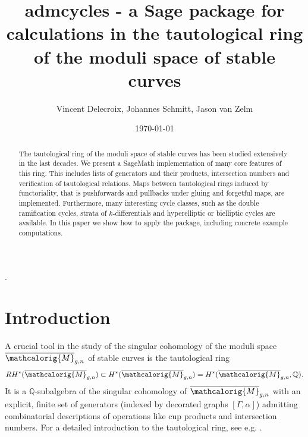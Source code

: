 \documentclass[11pt]{article}
\title{admcycles - a {S}age package for calculations in the tautological ring of the moduli space of stable curves}
\author{Vincent Delecroix, Johannes Schmitt, Jason van Zelm}
\date{\today}
\newcommand{\M}{\ensuremath{\overline{\mathcalorig{M}}}}
\newcommand{\Sage}{SageMath}
\begin{document}

\maketitle



  {}%
  {}%
  {\it}%
  {}%
  {\bfseries}%
  {.}%
  { }%
  {}%

 \theoremstyle{test}
\newtheorem{Def}{Definition}[section]
\newtheorem{Exa}[Def]{Example}
\newtheorem{Rmk}[Def]{Remark}
\newtheorem{Exe}[Def]{Exercise}
\newtheorem{Theo}[Def]{Theorem}
\newtheorem{Lem}[Def]{Lemma}
\newtheorem{Cor}[Def]{Corollary}
\newtheorem{Pro}[Def]{Proposition}
\newtheorem*{Rmk*}{Remark}   %
\newtheorem*{Exa*}{Example}   %
\newtheorem*{Pro*}{Proposition} %
\newtheorem*{Def*}{Definition}
\newtheorem*{Cor*}{Corollary}
\newtheorem*{Lem*}{Lemma}
\newtheorem*{Theo*}{Theorem}

\begin{abstract}
 The tautological ring of the moduli space of stable curves has been studied extensively in the last decades. We present a \Sage{} implementation of many core features of this ring. This includes lists of generators and their products, intersection numbers and verification of tautological relations. Maps between tautological rings induced by functoriality, that is pushforwards and pullbacks under gluing and forgetful maps, are implemented. Furthermore, many interesting cycle classes, such as the double ramification cycles, strata of $k$-differentials and hyperelliptic or bielliptic cycles are available. In this paper we show how to apply the package, including concrete example computations.
\end{abstract}

\tableofcontents

\section{Introduction}
A crucial tool in the study of the singular cohomology of the moduli space $\M_{g,n}$ of stable curves is the tautological ring \[RH^*(\M_{g,n}) \subset H^*(\M_{g,n}) = H^*(\M_{g,n}, \mathbb{Q}).\]
It is a $\mathbb{Q}$-subalgebra of the singular cohomology of $\M_{g,n}$ with an explicit, finite set of generators (indexed by decorated graphs $[\Gamma, \alpha]$) admitting combinatorial descriptions of operations like cup products and intersection numbers.
For a detailed introduction to the tautological ring, see e.g. \cite{faber2000,Arbarello2011,calcmodcurves}.
\end{document}
